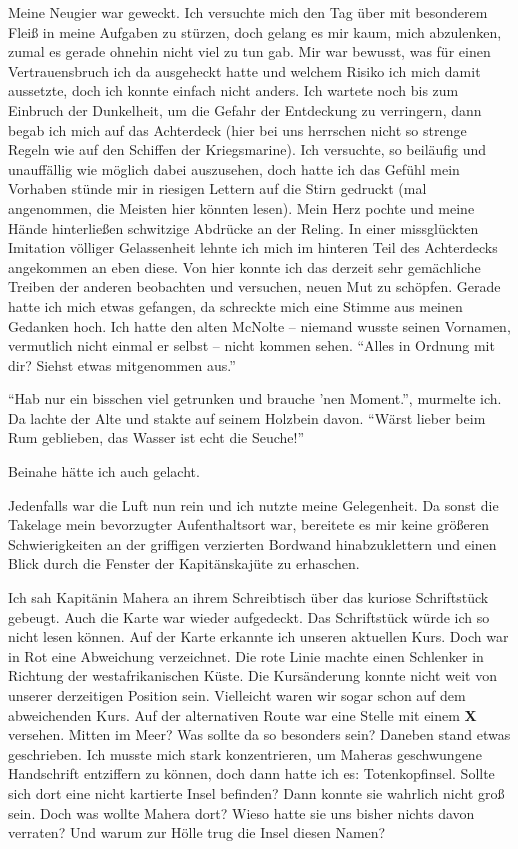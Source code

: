 Meine Neugier war geweckt. Ich versuchte mich den Tag über mit besonderem Fleiß in meine Aufgaben zu stürzen, doch gelang es mir kaum, mich abzulenken, zumal es gerade ohnehin nicht viel zu tun gab. Mir war bewusst, was für einen Vertrauensbruch ich da ausgeheckt hatte und welchem Risiko ich mich damit aussetzte, doch ich konnte einfach nicht anders. Ich wartete noch bis zum Einbruch der Dunkelheit, um die Gefahr der Entdeckung zu verringern, dann begab ich mich auf das Achterdeck (hier bei uns herrschen nicht so strenge Regeln wie auf den Schiffen der Kriegsmarine). Ich versuchte, so beiläufig und unauffällig wie möglich dabei auszusehen, doch hatte ich das Gefühl mein Vorhaben stünde mir in riesigen Lettern auf die Stirn gedruckt (mal angenommen, die Meisten hier könnten lesen). Mein Herz pochte und meine Hände hinterließen schwitzige Abdrücke an der Reling. In einer missglückten Imitation völliger Gelassenheit lehnte ich mich im hinteren Teil des Achterdecks angekommen an eben diese. Von hier konnte ich das derzeit sehr gemächliche Treiben der anderen beobachten und versuchen, neuen Mut zu schöpfen. Gerade hatte ich mich etwas gefangen, da schreckte mich eine Stimme aus meinen Gedanken hoch. Ich hatte den alten McNolte -- niemand wusste seinen Vornamen, vermutlich nicht einmal er selbst -- nicht kommen sehen. \enquote{Alles in Ordnung mit dir? Siehst etwas mitgenommen aus.}

\enquote{Hab nur ein bisschen viel getrunken und brauche 'nen Moment.}, murmelte ich. Da lachte der Alte und stakte auf seinem Holzbein davon. \enquote{Wärst lieber beim Rum geblieben, das Wasser ist echt die Seuche!}

Beinahe hätte ich auch gelacht.

Jedenfalls war die Luft nun rein und ich nutzte meine Gelegenheit. Da sonst die Takelage mein bevorzugter Aufenthaltsort war, bereitete es mir keine größeren Schwierigkeiten an der griffigen verzierten Bordwand hinabzuklettern und einen Blick durch die Fenster der Kapitänskajüte zu erhaschen.

Ich sah Kapitänin Mahera an ihrem Schreibtisch über das kuriose Schriftstück gebeugt. Auch die Karte war wieder aufgedeckt. Das Schriftstück würde ich so nicht lesen können. Auf der Karte erkannte ich unseren aktuellen Kurs. Doch war in Rot eine Abweichung verzeichnet. Die rote Linie machte einen Schlenker in Richtung der westafrikanischen Küste. Die Kursänderung konnte nicht weit von unserer derzeitigen Position sein. Vielleicht waren wir sogar schon auf dem abweichenden Kurs. Auf der alternativen Route war eine Stelle mit einem {\boldfont\textbf{X}} versehen. Mitten im Meer? Was sollte da so besonders sein? Daneben stand etwas geschrieben. Ich musste mich stark konzentrieren, um Maheras geschwungene Handschrift entziffern zu können, doch dann hatte ich es: Totenkopfinsel. Sollte sich dort eine nicht kartierte Insel befinden? Dann konnte sie wahrlich nicht groß sein. Doch was wollte Mahera dort? Wieso hatte sie uns bisher nichts davon verraten? Und warum zur Hölle trug die Insel diesen Namen?

